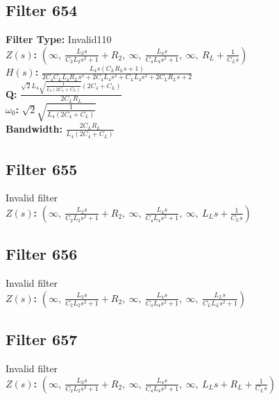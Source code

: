 \documentclass{article}
\begin{document}
\subsection*{Filter 654}
\textbf{Filter Type:} Invalid110 \\ 
\textbf{$Z(s)$:} $\left( \infty, \  \frac{L_{2} s}{C_{2} L_{2} s^{2} + 1} + R_{2}, \  \infty, \  \frac{L_{4} s}{C_{4} L_{4} s^{2} + 1}, \  \infty, \  R_{L} + \frac{1}{C_{L} s}\right)$ \\ 
\textbf{$H(s)$:} $\frac{L_{4} s \left(C_{L} R_{L} s + 1\right)}{2 C_{4} C_{L} L_{4} R_{L} s^{3} + 2 C_{4} L_{4} s^{2} + C_{L} L_{4} s^{2} + 2 C_{L} R_{L} s + 2}$ \\ 
\textbf{Q:} $\frac{\sqrt{2} L_{4} \sqrt{\frac{1}{L_{4} \left(2 C_{4} + C_{L}\right)}} \left(2 C_{4} + C_{L}\right)}{2 C_{L} R_{L}}$ \\ 
\textbf{$\omega_0$:} $\sqrt{2} \sqrt{\frac{1}{L_{4} \left(2 C_{4} + C_{L}\right)}}$ \\ 
\textbf{Bandwidth:} $\frac{2 C_{L} R_{L}}{L_{4} \left(2 C_{4} + C_{L}\right)}$ \\ 
\subsection*{Filter 655}
Invalid filter \\ 
\textbf{$Z(s)$:} $\left( \infty, \  \frac{L_{2} s}{C_{2} L_{2} s^{2} + 1} + R_{2}, \  \infty, \  \frac{L_{4} s}{C_{4} L_{4} s^{2} + 1}, \  \infty, \  L_{L} s + \frac{1}{C_{L} s}\right)$ \\ 
\subsection*{Filter 656}
Invalid filter \\ 
\textbf{$Z(s)$:} $\left( \infty, \  \frac{L_{2} s}{C_{2} L_{2} s^{2} + 1} + R_{2}, \  \infty, \  \frac{L_{4} s}{C_{4} L_{4} s^{2} + 1}, \  \infty, \  \frac{L_{L} s}{C_{L} L_{L} s^{2} + 1}\right)$ \\ 
\subsection*{Filter 657}
Invalid filter \\ 
\textbf{$Z(s)$:} $\left( \infty, \  \frac{L_{2} s}{C_{2} L_{2} s^{2} + 1} + R_{2}, \  \infty, \  \frac{L_{4} s}{C_{4} L_{4} s^{2} + 1}, \  \infty, \  L_{L} s + R_{L} + \frac{1}{C_{L} s}\right)$ \\ 
\end{document}
